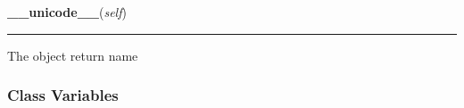     \vspace{0.5ex}

\hspace{.8\funcindent}\begin{boxedminipage}{\funcwidth}

    \raggedright \textbf{\_\_unicode\_\_}(\textit{self})

    \vspace{-1.5ex}

    \rule{\textwidth}{0.5\fboxrule}
\setlength{\parskip}{2ex}
    The object return name

\setlength{\parskip}{1ex}
    \end{boxedminipage}



  \subsubsection{Class Variables}

